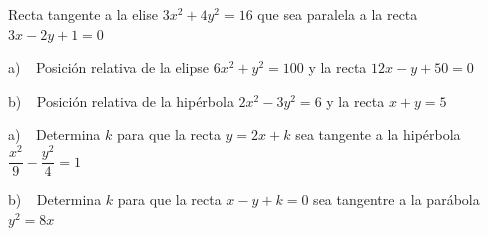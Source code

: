 \begin{mipropuesto}

Recta tangente a la elise $3x^2+4y^2=16$ que sea paralela a la recta $3x-2y+1=0$

	
\end{mipropuesto}

\vspace{-6mm}
\begin{flushright}
\begin{footnotesize} \textcolor{gris}{}	\end{footnotesize}
\end{flushright}

\begin{mipropuesto}

a) $\ \ $ Posición relativa de la elipse $ 6x^2+y^2=100$ y la recta $12x-y+50=0$

\vspace{2mm} b) $\ \ $ Posición relativa de la hipérbola $2x^2-3y^2=6$ y la recta $x+y=5$ 
	
\end{mipropuesto}

\vspace{-6mm}
\begin{flushright}
\begin{footnotesize} \textcolor{gris}{}	\end{footnotesize}
\end{flushright}

\begin{mipropuesto}

a) $\ \ $ Determina $k$ para que la recta $y=2x+k$ sea tangente a la hipérbola $\dfrac {x^2}{9}-\dfrac{y^2}{4}=1$

\vspace{2mm} b) $\ \ $ Determina $k$ para que la recta $x-y+k=0$ sea tangentre a la parábola $y^2=8x$
	
\end{mipropuesto}

\vspace{-6mm}
\begin{flushright}
\begin{footnotesize} \textcolor{gris}{}	\end{footnotesize}
\end{flushright}





